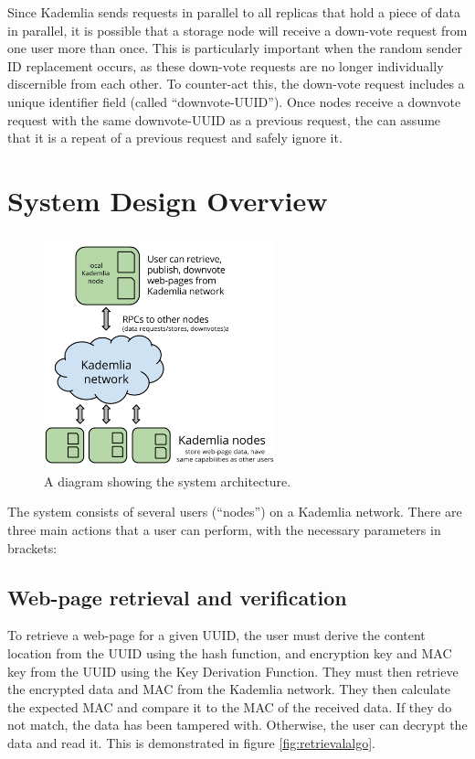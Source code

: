 Since Kademlia sends requests in parallel to all replicas that hold a piece of data in parallel, it is possible that a storage
node will receive a down-vote request from one user more than once. This is particularly important when the random sender ID
replacement occurs, as these down-vote requests are no longer individually discernible from each other. To counter-act this,
the down-vote request includes a unique identifier field (called ``downvote-UUID''). Once nodes receive a downvote request
with the same downvote-UUID as a previous request, the can assume that it is a repeat of a previous request and safely ignore it.

\section{System Design Overview}

\begin{figure}[H]
    \centering
    \includegraphics[width=0.6\textwidth]{img/arch.png}
    \caption{A diagram showing the system architecture.}
    \label{fig:arch}
\end{figure}

The system consists of several users (``nodes'') on a Kademlia network. There are three main actions that a user can perform,
with the necessary parameters in brackets:

\subsection{Web-page retrieval and verification}

To retrieve a web-page for a given UUID, the user must derive the content location from the UUID using the hash function,
and encryption key and MAC key from the UUID using the Key Derivation Function. They must then retrieve the encrypted data
and MAC from the Kademlia network. They then calculate the expected MAC and compare it to the MAC of the received data. If
they do not match, the data has been tampered with. Otherwise, the user can decrypt the data and read it. This is demonstrated in
figure \ref{fig:retrievalalgo}.

